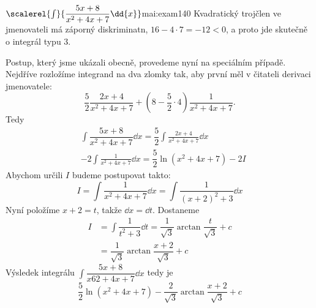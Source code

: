 \begin{mathexam}{\(\scalerel{\int}{\dfrac{5x+8}{x^2+4x+7}\dd{x}}\)\cite[s.~73]{Knichal}}{mai:exam140}
  Kvadratický trojčlen ve jmenovateli má záporný diskriminatn, \(16-4\cdot7 = -12<0\), a proto jde
  skutečně o integrál typu 3.
  
  Postup, který jsme ukázali obecně, provedeme nyní na speciálním případě. Nejdříve rozložíme
  integrand na dva zlomky tak, aby první měl v čitateli derivaci jmenovatele: 
  \begin{equation*}
    \frac{5}{2}\frac{2x+4}{x^2+4x+7} + \left(8-\frac{5}{2}\cdot4\right)\frac{1}{x^2+4x+7}.
  \end{equation*}
  Tedy
  \begin{align*}
    & \int\dfrac{5x+8}{x^2+4x+7}\dd{x}  = \dfrac{5}{2}\int\frac{2x+4}{x^2+4x+7}\dd{x}  \\
    &-2\int\frac{1}{x^2+4x+7}\dd{x}     = \dfrac{5}{2}\ln(x^2+4x+7) - 2I
  \end{align*}
  Abychom určili \(I\) budeme postupovat takto:
  \begin{equation*}
    I = \int\dfrac{1}{x^2+4x+7}\dd{x} = \int\dfrac{1}{(x+2)^2+3}\dd{x} 
  \end{equation*}
  Nyní položíme \(x+2=t\), takže \(\dd{x}= \dd{t}\). Dostaneme
  \begin{align*}
    I &= \int\dfrac{1}{t^2+3}\dd{t} = \dfrac{1}{\sqrt{3}}\arctan\dfrac{t}{\sqrt{3}} + c \\
      &= \dfrac{1}{\sqrt{3}}\arctan\dfrac{x+2}{\sqrt{3}} + c
  \end{align*}
  Výsledek integrálu \(\int\dfrac{5x+8}{x62+4x+7}\dd{x}\) tedy je 
  \begin{equation*}
    \dfrac{5}{2}\ln(x^2+4x+7) - \dfrac{2}{\sqrt{3}}\arctan\dfrac{x+2}{\sqrt{3}} + c
  \end{equation*}
\end{mathexam}